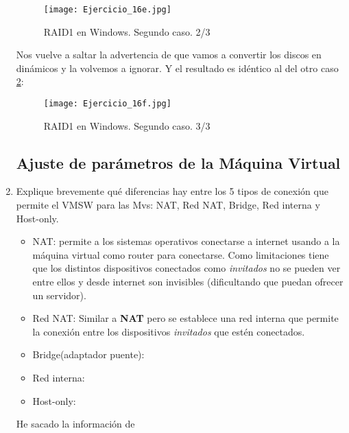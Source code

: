 \documentclass[paper=a4, fontsize=11pt]{scrartcl} %
\numberwithin{equation}{section} %
\numberwithin{figure}{section} %
\numberwithin{table}{section} %
\begin{document}
\begin{enumerate}
		\begin{figure}[H]
			\centering
			\texttt{[image: Ejercicio\_16e.jpg]}
			\caption{RAID1 en Windows. Segundo caso. 2/3} 	
			\label{fig:RAID1 2-2/3}
		\end{figure}

		Nos vuelve a saltar la advertencia de que vamos a convertir los discos en dinámicos y la 
		volvemos a ignorar. Y el resultado es idéntico al del otro caso \ref{fig:RAID1 2-3/3}:
		
		\begin{figure}[H]
			\centering
			\texttt{[image: Ejercicio\_16f.jpg]}
			\caption{RAID1 en Windows. Segundo caso. 3/3} 	
			\label{fig:RAID1 2-3/3}
		\end{figure}
		
		
	\subsection{Ajuste de parámetros de la Máquina Virtual}
		\item Explique brevemente qué diferencias hay entre los 5 tipos de conexión que permite el
		VMSW para las Mvs: NAT, Red NAT, Bridge, Red interna y Host-only.
		\begin{itemize}
			\item NAT: permite a los sistemas operativos conectarse a internet usando a la máquina
			virtual como router para conectarse. Como limitaciones tiene que los distintos dispositivos
			conectados como \textit{invitados} no se pueden ver entre ellos y desde internet son
			invisibles (dificultando que puedan ofrecer un servidor).
			\item Red NAT: Similar a \textbf{NAT} pero se establece una red interna que permite la
			conexión entre los dispositivos \textit{invitados} que estén conectados.
			\item Bridge(adaptador puente): %
			\item Red interna: %
			\item Host-only: %
		\end{itemize}
		
		He sacado la información de \cite{VM_Network}
		

\end{enumerate}
\end{document}
